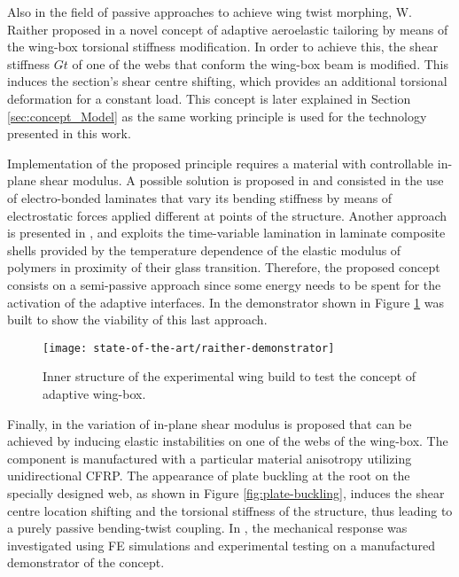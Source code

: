   Also in the field of passive approaches to achieve wing twist morphing, W. Raither proposed in \cite{Raither2013a} a novel concept of adaptive aeroelastic tailoring by means of the wing-box torsional stiffness modification. In order to achieve this, the shear stiffness $G t$ of one of the webs that conform the wing-box beam is modified. This induces the section's shear centre shifting, which provides an additional torsional deformation for a constant load. This concept is later explained in Section \ref{sec:concept_Model} as the same working principle is used for the technology presented in this work.

  Implementation of the proposed principle requires a material with controllable in-plane shear modulus. A possible solution is proposed in \cite{Bergamini2006} and consisted in the use of electro-bonded laminates that vary its bending stiffness by means of electrostatic forces applied different at points of the structure. Another approach is presented in \cite{Raither2012}, and exploits the time-variable lamination in laminate composite shells provided by the temperature dependence of the elastic modulus of polymers in proximity of their glass transition. Therefore, the proposed concept consists on a semi-passive approach since some energy needs to be spent for the activation of the adaptive interfaces. In \cite{Raither2013} the demonstrator shown in Figure \ref{fig:raither-demonstrator} was built to show the viability of this last approach.

  \begin{figure}[!htpb]
    \centering
    \texttt{[image: state-of-the-art/raither-demonstrator]}
    \caption[Inner structure of the experimental wing build to test the concept of adaptive wing-box]{Inner structure of the experimental wing build to test the concept of adaptive wing-box. \cite{Raither2013}}\label{fig:raither-demonstrator}
  \end{figure}

  Finally, in \cite{Runkel2016} the variation of in-plane shear modulus is proposed that can be achieved by inducing elastic instabilities on one of the webs of the wing-box. The component is manufactured with a particular material anisotropy utilizing unidirectional CFRP. The appearance of plate buckling at the root on the specially designed web, as shown in Figure \ref{fig:plate-buckling}, induces the shear centre location shifting and the torsional stiffness of the structure, thus leading to a purely passive bending-twist coupling. In \cite{Andreas2015}, the mechanical response was investigated using FE simulations and experimental testing on a manufactured demonstrator of the concept.


